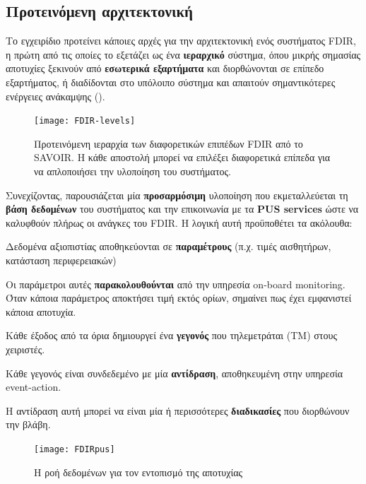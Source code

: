 \documentclass[a4paper,nobib]{tufte-book}
\begin{document}
\subsection{Προτεινόμενη αρχιτεκτονική}

Το εγχειρίδιο προτείνει κάποιες αρχές για την αρχιτεκτονική ενός συστήματος \acs{FDIR}, η πρώτη από τις οποίες το εξετάζει ως ένα \textbf{ιεραρχικό} σύστημα, όπου μικρής σημασίας αποτυχίες ξεκινούν από \textbf{εσωτερικά εξαρτήματα} και διορθώνονται σε επίπεδο εξαρτήματος, ή διαδίδονται στο υπόλοιπο σύστημα και απαιτούν σημαντικότερες ενέργειες ανάκαμψης ().

\begin{figure}
	\texttt{[image: FDIR-levels]}
	\caption[Προτεινόμενη ιεραρχία των διαφορετικών επιπέδων FDIR από το SAVOIR]{Προτεινόμενη ιεραρχία των διαφορετικών επιπέδων \acs{FDIR} από το \acs{SAVOIR}. Η κάθε αποστολή μπορεί να επιλέξει διαφορετικά επίπεδα για να απλοποιήσει την υλοποίηση του συστήματος.}
	\label{fig:FDIR-levels}
\end{figure}

Συνεχίζοντας, παρουσιάζεται μία \textbf{προσαρμόσιμη} υλοποίηση που εκμεταλλεύεται τη \textbf{βάση δεδομένων} του συστήματος και την επικοινωνία με τα \textbf{\acs{PUS} services} ώστε να καλυφθούν πλήρως οι ανάγκες του \acs{FDIR}. Η λογική αυτή προϋποθέτει τα ακόλουθα:
\begin{compactenum}
	\item Δεδομένα αξιοπιστίας αποθηκεύονται σε \textbf{παραμέτρους} (π.χ. τιμές αισθητήρων, κατάσταση περιφερειακών)
	\item Οι παράμετροι αυτές \textbf{παρακολουθούνται} από την υπηρεσία on-board monitoring. Όταν κάποια παράμετρος αποκτήσει τιμή εκτός ορίων, σημαίνει πως έχει εμφανιστεί κάποια αποτυχία.
	\item Κάθε έξοδος από τα όρια δημιουργεί ένα \textbf{γεγονός} που τηλεμετράται (\acs{TM}) στους χειριστές.
	\item Κάθε γεγονός είναι συνδεδεμένο με μία \textbf{αντίδραση}, αποθηκευμένη στην υπηρεσία event-action.
	\item Η αντίδραση αυτή μπορεί να είναι μία ή περισσότερες \textbf{διαδικασίες} που διορθώνουν την βλάβη.
\end{compactenum}

\begin{figure}[h]
	\texttt{[image: FDIRpus]}
	\caption{Η ροή δεδομένων για τον εντοπισμό της αποτυχίας}
\end{figure}
\end{document}

